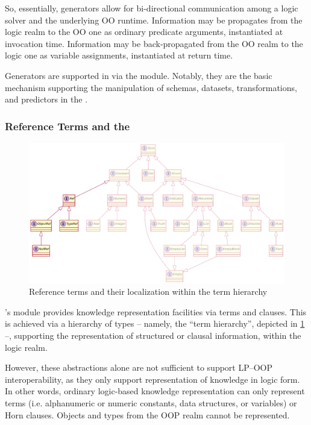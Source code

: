 \documentclass[12pt,a4paper,openright,twoside]{book}
\begin{document}
So, essentially, generators allow for bi-directional communication among a logic solver and the underlying OO runtime.
%
Information may be propagates from the logic realm to the OO one as ordinary predicate arguments, instantiated at invocation time.
%
Information may be back-propagated from the OO realm to the logic one as variable assignments, instantiated at return time.

Generators are supported in \twopkt{} via the  module.
%
Notably, they are the basic mechanism supporting the manipulation of schemas, datasets, transformations, and predictors in the \mllib{}.

\subsubsection{Reference Terms and the }\label{sssec:ref-terms}

\begin{figure}
    \centering
    \includegraphics[width=0.8\linewidth]{figures/terms.pdf}
    \caption{Reference terms and their localization within the \twopkt{} term hierarchy}
    \label{fig:terms}
\end{figure}

\twopkt{}'s  module provides knowledge representation facilities via terms and clauses.
%
This is achieved via a hierarchy of types -- namely, the ``term hierarchy'', depicted in \cref{fig:terms} --, supporting the representation of structured or clausal information, within the logic realm.

However, these abstractions alone are not sufficient to support LP--OOP interoperability, as they only support representation of knowledge in logic form.
%
In other words, ordinary logic-based knowledge representation can only represent terms (i.e. alphanumeric or numeric constants, data structures, or variables) or Horn clauses.
%
Objects and types from the OOP realm cannot be represented.
\end{document}
